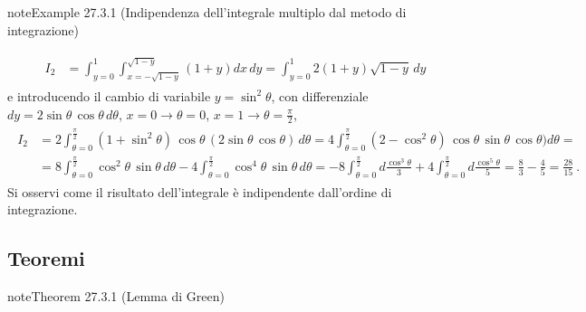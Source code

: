 \documentclass[letterpaper,10pt,italian]{jupyterBook}
\begin{document}
\begin{sphinxadmonition}{note}{Example 27.3.1 (Indipendenza dell’integrale multiplo dal metodo di integrazione)}
\begin{enumerate}
\end{enumerate}
\begin{equation*}
\begin{split}\begin{aligned}
I_2
& = \int_{y=0}^{1} \int_{x=-\sqrt{1-y}}^{\sqrt{1-y}} \left( 1 + y \right) dx \, dy 
  = \int_{y=0}^{1} 2 ( 1 + y )\sqrt{1-y} \, dy 
\end{aligned}\end{split}
\end{equation*}
\sphinxAtStartPar
e introducendo il cambio di variabile \(y = \sin^2 \theta\), con differenziale \(dy = 2 \sin \theta \, \cos \theta \, d \theta\), \(x=0 \rightarrow \theta = 0\), \(x = 1 \rightarrow \theta = \frac{\pi}{2}\),
\begin{equation*}
\begin{split}\begin{aligned}
I_2 
& =  2 \int_{\theta=0}^{\frac{\pi}{2}} (1 + \sin^2 \theta) \, \cos \theta \, ( 2 \sin \theta \, \cos \theta ) \, d \theta
  =  4 \int_{\theta=0}^{\frac{\pi}{2}} (2 - \cos^2 \theta) \, \cos \theta \, \sin \theta \, \cos \theta )  d \theta = \\
& =  8 \int_{\theta=0}^{\frac{\pi}{2}} \cos^2 \theta \, \sin \theta \,  d \theta
   - 4 \int_{\theta=0}^{\frac{\pi}{2}} \cos^4 \theta \, \sin \theta \,  d \theta 
  =- 8 \int_{\theta=0}^{\frac{\pi}{2}} d \frac{\cos^3 \theta}{3}
   + 4 \int_{\theta=0}^{\frac{\pi}{2}} d \frac{\cos^5 \theta}{5} 
  = \frac{8}{3} - \frac{4}{5} = \frac{28}{15} \ .
\end{aligned}\end{split}
\end{equation*}
\sphinxAtStartPar
Si osservi come il risultato dell’integrale è indipendente dall’ordine di integrazione.


\end{sphinxadmonition}


\subsection{Teoremi}
\label{\detokenize{ch/multivariable-calculus/integrals:teoremi}}\label{\detokenize{ch/multivariable-calculus/integrals:multivariable-calculus-integrals-thms}}\label{ch/multivariable-calculus/integrals:theorem-3}
\begin{sphinxadmonition}{note}{Theorem 27.3.1 (Lemma di Green)}


\end{sphinxadmonition}
\end{document}
